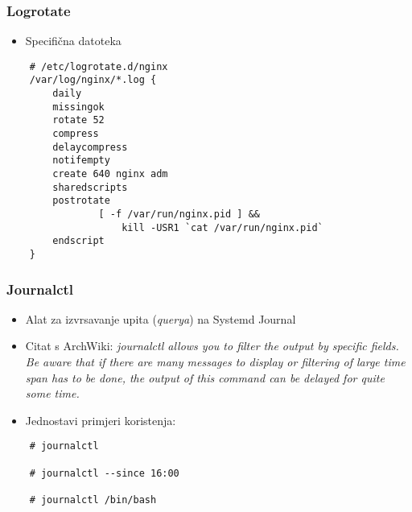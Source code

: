 \documentclass[t,table,usenames,dvipsnames]{beamer}
\begin{document}
\begin{frame}[fragile]
    \frametitle{Logrotate}
    \begin{itemize}
        \item Specifična datoteka
    \end{itemize}
    \begin{verbatim}
    # /etc/logrotate.d/nginx
    /var/log/nginx/*.log {
        daily
        missingok
        rotate 52
        compress
        delaycompress
        notifempty
        create 640 nginx adm
        sharedscripts
        postrotate
                [ -f /var/run/nginx.pid ] && 
                    kill -USR1 `cat /var/run/nginx.pid`
        endscript
    }

    \end{verbatim}

\end{frame}

\begin{frame}[fragile]
    \frametitle{Journalctl}
    \begin{itemize}
        \item Alat za izvrsavanje upita (\textit{querya}) na Systemd Journal
        \item Citat s ArchWiki:
            \textit{journalctl allows you to filter the output by specific fields. Be aware that if there
            are many messages to display or filtering of large time span has to be done, the output
        of this command can be delayed for quite some time.}
        \item Jednostavi primjeri koristenja:
    \end{itemize}
    \begin{verbatim}
    # journalctl

    # journalctl --since 16:00

    # journalctl /bin/bash
    \end{verbatim}
\end{frame}
\end{document}
